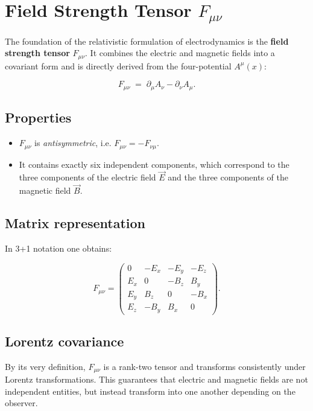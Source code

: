 \section{Field Strength Tensor \(F_{\mu\nu}\)}
\label{anhangA:feldstaerketensor}

The foundation of the relativistic formulation of electrodynamics
is the \textbf{field strength tensor} \( F_{\mu\nu} \).
It combines the electric and magnetic fields into a 
covariant form and is directly derived from the four-potential 
\( A^\mu(x) \):

\[
F_{\mu\nu} \;=\; \partial_\mu A_\nu - \partial_\nu A_\mu .
\]

\subsection*{Properties}
\begin{itemize}
	\item \( F_{\mu\nu} \) is \emph{antisymmetric}, i.e. 
	\( F_{\mu\nu} = - F_{\nu\mu} \).  
	\item It contains exactly six independent components, 
	which correspond to the three components of the electric field \( \vec{E} \) 
	and the three components of the magnetic field \( \vec{B} \).
\end{itemize}

\subsection*{Matrix representation}
In 3+1 notation one obtains:

\[
F_{\mu\nu} = 
\begin{pmatrix}
	0      & -E_x & -E_y & -E_z \\
	E_x    & 0    & -B_z & B_y \\
	E_y    & B_z  & 0    & -B_x \\
	E_z    & -B_y & B_x  & 0
\end{pmatrix}.
\]

\subsection*{Lorentz covariance}
By its very definition, \( F_{\mu\nu} \) is a rank-two tensor
and transforms consistently under Lorentz transformations.
This guarantees that electric and magnetic fields
are not independent entities, but instead transform into one another 
depending on the observer.
